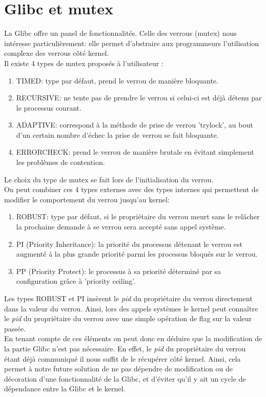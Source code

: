 \section*{Glibc et mutex}
La Glibc offre un panel de fonctionnalités. 
Celle des verrous (mutex) nous intéresse particulièrement: elle permet 
d'abstraire aux programmeurs l'utilisation complexe des verrous côté kernel.
\\

Il existe 4 types de mutex proposés à l'utilisateur :
\begin{enumerate}
	\item TIMED: type par défaut, prend le verrou de manière bloquante.
	\item RECURSIVE: ne tente pas de prendre le verrou si celui-ci est
	déjà détenu par le processus courant.
	\item ADAPTIVE: correspond à la méthode de prise de verrou 'trylock',
	au bout d'un certain nombre d'échec la prise de verrou se fait
	bloquante.
	\item ERRORCHECK: prend le verrou de manière brutale en évitant
	simplement les problèmes de contention.
\end{enumerate}
Le choix du type de mutex se fait lors de l'initialisation du verrou.
\\
On peut combiner ces 4 types externes avec des types internes qui permettent de
modifier le comportement du verrou jusqu'au kernel:

\begin{enumerate}
	\item ROBUST: type par défaut, si le propriétaire du verrou meurt sans
	le relâcher la prochaine demande à se verrou sera accepté sans appel
	système.
	\item PI (Priority Inheritance): la priorité du processus détenant le
	verrou est augmenté à la plus grande priorité parmi les processus
	bloqués sur le verrou.
	\item PP (Priority Protect): le processus à sa priorité déterminé par
	sa configuration grâce à 'priority ceiling'.
\end{enumerate}
Les types ROBUST et PI insèrent le \textit{pid} du propriétaire du verrou
directement dans la valeur du verrou. Ainsi, lors des appels systèmes le kernel
peut connaître le \textit{pid} du propriétaire du verrou avec une simple
opération de flag sur la valeur passée.
\\

En tenant compte de ces éléments on peut donc en déduire que la modification 
de la partie Glibc n'est pas nécessaire. En effet, le \textit{pid} du 
propriétaire du verrou étant déjà communiqué il nous suffit de le récupérer 
côté kernel. Ainsi, cela permet à notre future solution de ne pas dépendre de 
modification ou de décoration d'une fonctionnalité de la Glibc, et d'éviter 
qu'il y ait un cycle de dépendance entre la Glibc et le kernel.
